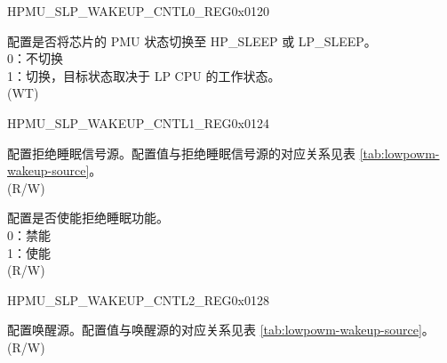 \begin{register}{H}{PMU\_SLP\_WAKEUP\_CNTL0\_REG}{0x0120}\label{regdesc:PMUSLPWAKEUPCNTL0REG}
%
%
\regnewline%
\begin{regdesc}\begin{reglist}
\label{fielddesc:PMUSLEEPREQ}\item [PMU\_SLEEP\_REQ] 配置是否将芯片的 PMU 状态切换至 HP\_SLEEP 或 LP\_SLEEP。\\
0：不切换\\
1：切换，目标状态取决于 LP CPU 的工作状态。\\
(WT)
\end{reglist}\end{regdesc}
\end{register}


\begin{register}{H}{PMU\_SLP\_WAKEUP\_CNTL1\_REG}{0x0124}\label{regdesc:PMUSLPWAKEUPCNTL1REG}
%
%
\regnewline%
\begin{regdesc}\begin{reglist}
\label{fielddesc:PMUSLEEPREJECTENA}\item [PMU\_SLEEP\_REJECT\_ENA] 配置拒绝睡眠信号源。配置值与拒绝睡眠信号源的对应关系见表 \ref{tab:lowpowm-wakeup-source}。\\
(R/W)
\label{fielddesc:PMUSLPREJECTEN}\item [PMU\_SLP\_REJECT\_EN] 配置是否使能拒绝睡眠功能。\\
0：禁能\\
1：使能\\
(R/W)
\end{reglist}\end{regdesc}
\end{register}


\begin{register}{H}{PMU\_SLP\_WAKEUP\_CNTL2\_REG}{0x0128}\label{regdesc:PMUSLPWAKEUPCNTL2REG}
%
\regnewline%
\begin{regdesc}\begin{reglist}
\label{fielddesc:PMUWAKEUPENA}\item [PMU\_WAKEUP\_ENA] 配置唤醒源。配置值与唤醒源的对应关系见表 \ref{tab:lowpowm-wakeup-source}。\\ (R/W)
\end{reglist}\end{regdesc}
\end{register}


